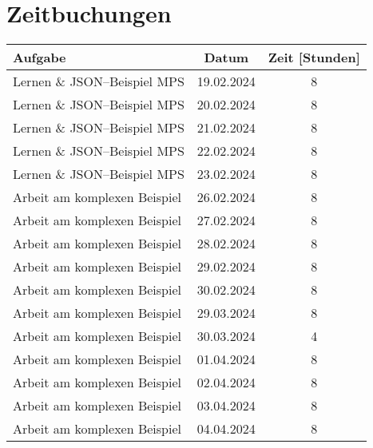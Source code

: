 \section{Zeitbuchungen}\label{sec:zeitbuchungen}
\begin{table}[H]
    \centering
    \begin{tabular}{|l|c|c|}
        \hline
        Aufgabe                                & Datum      & Zeit [Stunden] \\
        \hline
        \hline
        Lernen \& \ac{JSON}--Beispiel \ac{MPS} & 19.02.2024 & 8              \\
        \hline
        Lernen \& \ac{JSON}--Beispiel \ac{MPS} & 20.02.2024 & 8              \\
        \hline
        Lernen \& \ac{JSON}--Beispiel \ac{MPS} & 21.02.2024 & 8              \\
        \hline
        Lernen \& \ac{JSON}--Beispiel \ac{MPS} & 22.02.2024 & 8              \\
        \hline
        Lernen \& \ac{JSON}--Beispiel \ac{MPS} & 23.02.2024 & 8              \\
        \hline
        Arbeit am komplexen Beispiel           & 26.02.2024 & 8              \\
        \hline
        Arbeit am komplexen Beispiel           & 27.02.2024 & 8              \\
        \hline
        Arbeit am komplexen Beispiel           & 28.02.2024 & 8              \\
        \hline
        Arbeit am komplexen Beispiel           & 29.02.2024 & 8              \\
        \hline
        Arbeit am komplexen Beispiel           & 30.02.2024 & 8              \\
        \hline
        Arbeit am komplexen Beispiel           & 29.03.2024 & 8              \\
        \hline
        Arbeit am komplexen Beispiel           & 30.03.2024 & 4              \\
        \hline
        Arbeit am komplexen Beispiel           & 01.04.2024 & 8              \\
        \hline
        Arbeit am komplexen Beispiel           & 02.04.2024 & 8              \\
        \hline
        Arbeit am komplexen Beispiel           & 03.04.2024 & 8              \\
        \hline
        Arbeit am komplexen Beispiel           & 04.04.2024 & 8              \\

\end{tabular}
\end{table}
